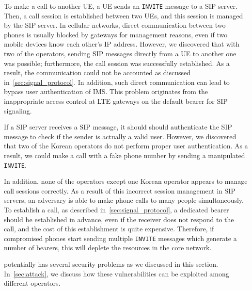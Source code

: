  To make a call to another UE, a UE sends an {\tt INVITE}
message to a SIP server. Then, a call session is established between two
UEs, and this session is managed by the SIP server. In cellular networks, direct
communication between two phones is usually blocked by gateways for management
reasons, even if two mobile devices know each other's IP address. However, we
discovered that with two of the operators, sending SIP messages directly from
a UE to another one was possible; furthermore, the call session was successfully
established. As a result, the communication could not be accounted as discussed
in~\autoref{sec:signal_protocol}. In addition, such direct communication can
lead to bypass user authentication of IMS. This problem originates from the
inappropriate access control at LTE gateways on the default bearer for SIP
signaling.


 If a SIP server receives a SIP message, it should should
authenticate the SIP message to check if the sender is actually a valid user.
However, we discovered that two of the Korean operators do not perform proper
user authentication.  As a result, we could make a call with a fake phone number
by sending a manipulated {\tt INVITE}.

In addition, none of the operators except one Korean operator appears to manage
call sessions correctly. As a result of this incorrect session
management in SIP servers, an adversary is able to make phone calls
to many people simultaneously. To establish a call, as described
in~\autoref{sec:signal_protocol}, a dedicated bearer should be established in
advance, even if the receiver does not respond to the call, and the cost of this
establishment is quite expensive. Therefore, if compromised phones start sending
multiple {\tt INVITE} messages which generate a number of bearers, this will
deplete the resources in the core network.



 \vt potentially has several security problems as we discussed in
this section. In~\autoref{sec:attack}, we discuss how these vulnerabilities can
be exploited among different operators.

